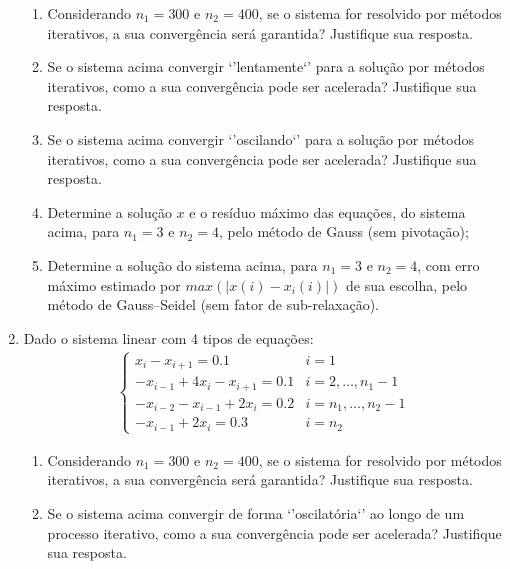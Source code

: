 \documentclass[12pt]{article}
\newenvironment{smallitem}{
    \vspace{-2mm}
    \begin{enumerate}
    \setlength{\parskip}{0pt}
    \setlength{\itemsep}{2pt}
}{
    \vspace{-2mm}
    \end{enumerate}
}
\begin{document}
\begin{enumerate}[label=\textbf{\arabic*})]
\begin{smallitem}

\item Considerando $n_1 = 300$ e $n_2 = 400$, se o sistema for resolvido por
métodos iterativos, a sua convergência será garantida? Justifique sua resposta.

\item Se o sistema acima convergir `'lentamente`' para a solução por métodos
iterativos, como a sua convergência pode ser acelerada? Justifique sua resposta.

\item Se o sistema acima convergir `'oscilando`' para a solução por métodos
iterativos, como a sua convergência pode ser acelerada? Justifique sua resposta.

\item Determine a solução $x$ e o resíduo máximo das equações, do sistema acima,
para $n_1 = 3$ e $n_2 = 4$, pelo método de Gauss (sem pivotação);

\item Determine a solução do sistema acima, para $n_1 = 3$ e $n_2 = 4$, com erro
máximo estimado por $max(\vert x(i)- x_i(i) \vert)$ de sua escolha, pelo método
de Gauss--Seidel (sem fator de sub-relaxação).

\end{smallitem}

\item Dado o sistema linear com 4 tipos de equações:
\begin{align*}
\begin{cases}
x_i - x_{i + 1} = 0.1 &
i = 1 \\
- x_{i - 1} + 4x_i - x_{i + 1} = 0.1 &
i = 2, \dots, n_1 - 1 \\
- x_{i - 2} - x_{i - 1} + 2x_i = 0.2 &
i = n_1, \dots, n_2 - 1 \\
- x_{i - 1} + 2x_i = 0.3 &
i = n_2
\end{cases}
\end{align*}

\begin{smallitem}

\item Considerando $n_1 = 300$ e $n_2 = 400$, se o sistema for resolvido por
métodos iterativos, a sua convergência será garantida? Justifique sua resposta.

\item Se o sistema acima convergir de forma `'oscilatória`' ao longo de um
processo iterativo, como a sua convergência pode ser acelerada? Justifique sua
resposta.


\end{smallitem}
\end{enumerate}
\end{document}
